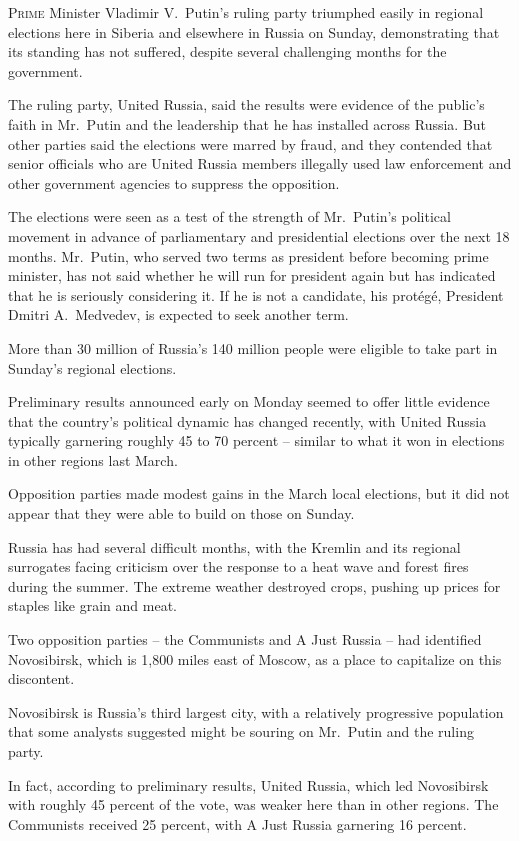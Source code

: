 ﻿\documentclass[12pt]{article}
\begin{document}
\lettrine{P}{rime} Minister Vladimir V.~Putin's ruling party triumphed
easily in regional elections here in Siberia and elsewhere in Russia on Sunday, demonstrating that
its standing has not suffered, despite several challenging months for the government.

The ruling party, United Russia, said the results were evidence of the public's faith in Mr.~Putin
and the leadership that he has installed across Russia. But other parties said the elections were
marred by fraud, and they contended that senior officials who are United Russia members illegally
used law enforcement and other government agencies to suppress the opposition.

The elections were seen as a test of the strength of Mr.~Putin's political movement in advance of
parliamentary and presidential elections over the next 18 months. Mr.~Putin, who served two terms as
president before becoming prime minister, has not said whether he will run for president again but
has indicated that he is seriously considering it. If he is not a candidate, his prot\'eg\'e,
President Dmitri A.~Medvedev, is expected to seek another term.

More than 30 million of Russia's 140 million people were eligible to take part in Sunday's regional
elections.

Preliminary results announced early on Monday seemed to offer little evidence that the country's
political dynamic has changed recently, with United Russia typically garnering roughly 45 to 70
percent -- similar to what it won in elections in other regions last March.

Opposition parties made modest gains in the March local elections, but it did not appear that they
were able to build on those on Sunday.

Russia has had several difficult months, with the Kremlin and its regional surrogates facing
criticism over the response to a heat wave and forest fires during the summer. The extreme weather
destroyed crops, pushing up prices for staples like grain and meat.

Two opposition parties -- the Communists and A Just Russia -- had identified Novosibirsk, which is
1,800 miles east of Moscow, as a place to capitalize on this discontent.

Novosibirsk is Russia's third largest city, with a relatively progressive population that some
analysts suggested might be souring on Mr.~Putin and the ruling party.

In fact, according to preliminary results, United Russia, which led Novosibirsk with roughly 45
percent of the vote, was weaker here than in other regions. The Communists received 25 percent, with
A Just Russia garnering 16 percent.
\end{document}
